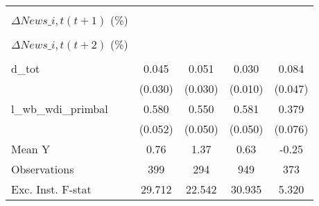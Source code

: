 {\begin{tabular}{l*{4}{c}}
                    &                     &                     &                     &                     \\
\addlinespace
$ \Delta News\_{i,t}(t+1)$ (\%)&                     &                     &                     &                     \\
                    &                     &                     &                     &                     \\
\addlinespace
$ \Delta News\_{i,t}(t+2)$ (\%)&                     &                     &                     &                     \\
                    &                     &                     &                     &                     \\
\addlinespace
d\_tot               &       0.045         &       0.051\sym{*}  &       0.030\sym{***}&       0.084\sym{*}  \\
                    &     (0.030)         &     (0.030)         &     (0.010)         &     (0.047)         \\
\addlinespace
l\_wb\_wdi\_primbal    &       0.580\sym{***}&       0.550\sym{***}&       0.581\sym{***}&       0.379\sym{***}\\
                    &     (0.052)         &     (0.050)         &     (0.050)         &     (0.076)         \\
\midrule
Mean Y              &        0.76         &        1.37         &        0.63         &       -0.25         \\
Observations        &         399         &         294         &         949         &         373         \\
Exc. Inst. F-stat   &      29.712         &      22.542         &      30.935         &       5.320         \\
\bottomrule
\end{tabular}
}
